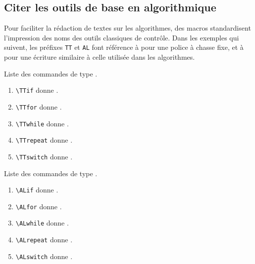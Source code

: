 \documentclass[12pt,a4paper]{article}
\begin{document}
\subsection{Citer les outils de base en algorithmique}

Pour faciliter la rédaction de textes sur les algorithmes, des macros standardisent l'impression des noms des outils classiques de contrôle.
Dans les exemples qui suivent, les préfixes \verb+TT+ et \verb+AL+ font référence à  pour une police à chasse fixe, et à  pour une écriture similaire à celle utilisée dans les algorithmes.



\begin{center}
	Liste des commandes de type .
\end{center}

\begin{enumerate}
    \item \verb+\TTif+ donne \TTif.
    \item \verb+\TTfor+ donne \TTfor.
    \item \verb+\TTwhile+ donne \TTwhile.
    \item \verb+\TTrepeat+ donne \TTrepeat.
    \item \verb+\TTswitch+ donne \TTswitch.
\end{enumerate}

\begin{center}
	Liste des commandes de type .
\end{center}

\begin{enumerate}
    \item \verb+\ALif+ donne \ALif.
    \item \verb+\ALfor+ donne \ALfor.
    \item \verb+\ALwhile+ donne \ALwhile.
    \item \verb+\ALrepeat+ donne \ALrepeat.
    \item \verb+\ALswitch+ donne \ALswitch.
\end{enumerate}
\end{document}

